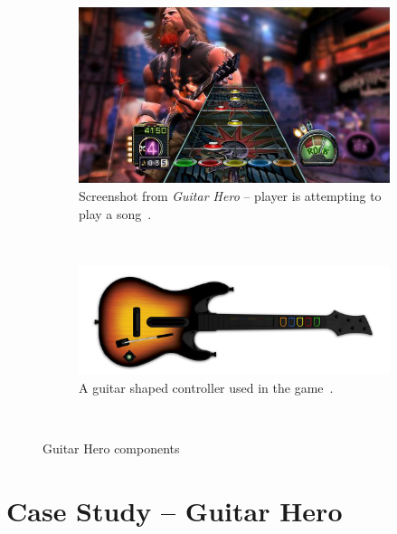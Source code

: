 \begin{figure}
        \centering
        \begin{subfigure}[b]{0.48\textwidth}
                \includegraphics[width=\textwidth]{Figures/guitarhero}
                \caption{Screenshot from \textit{Guitar Hero} -- player is attempting to play a song~\cite{ghscreen}.}
                \label{fig:Guitar Hero screenshot}
        \end{subfigure}%
        ~ %
        \begin{subfigure}[b]{0.48\textwidth}
                \includegraphics[width=\textwidth]{Figures/controller}
                \caption{A guitar shaped controller used in the game~\cite{controller}.}
                \label{fig:Controller}
        \end{subfigure}
          \caption{Guitar Hero components}
        ~ %
        \label{fig:GH}
\end{figure}

\vspace{20pt}


\section{Case Study -- Guitar Hero}


